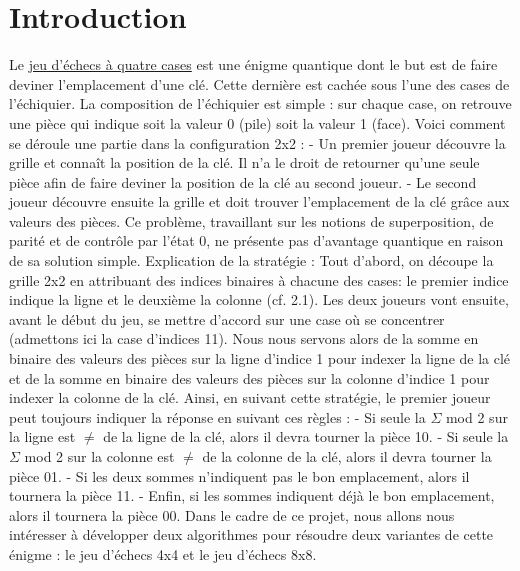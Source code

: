 \documentclass[12pt]{article}
\begin{document}
\section{Introduction}
Le \href{https://www.youtube.com/watch?v=LFwXghcajLw&list=PLtn704u3JW-K4q9YkQWTfWRxaq-9oLfJ3&index=4}{jeu d'échecs à quatre cases} est une énigme quantique dont le but est de faire deviner l'emplacement d'une clé. Cette dernière est cachée sous l'une des cases de l'échiquier.\newline
\newline
La composition de l'échiquier est simple : sur chaque case, on retrouve une pièce qui indique soit la valeur 0 (pile) soit la valeur 1 (face).\newline
\newline
Voici comment se déroule une partie dans la configuration 2x2 :
\newline
- Un premier joueur découvre la grille et connaît la position de la clé. Il n'a le droit de retourner qu'une seule pièce afin de faire deviner la position de la clé au second joueur.
\newline
- Le second joueur découvre ensuite la grille et doit trouver l'emplacement de la clé grâce aux valeurs des pièces.\newline
\newline
Ce problème, travaillant sur les notions de superposition, de parité et de contrôle par l'état 0, ne présente pas d'avantage quantique en raison de sa solution simple.\newline
\newline
Explication de la stratégie :\newline
Tout d'abord, on découpe la grille 2x2 en attribuant des indices binaires à chacune des cases: le premier indice indique la ligne et le deuxième la colonne (cf. 2.1).\newline
Les deux joueurs vont ensuite, avant le début du jeu, se mettre d'accord sur une case où se concentrer (admettons ici la case d'indices 11). Nous nous servons alors de la somme en binaire des valeurs des pièces sur la ligne d'indice 1 pour indexer la ligne de la clé et de la somme en binaire des valeurs des pièces sur la colonne d'indice 1 pour indexer la colonne de la clé.\newline
Ainsi, en suivant cette stratégie, le premier joueur peut toujours indiquer la réponse en suivant ces règles :\newline
- Si seule la $\Sigma$ mod 2 sur la ligne est $\ne$ de la ligne de la clé, alors il devra tourner la pièce 10.\newline
- Si seule la $\Sigma$ mod 2 sur la colonne est $\ne$ de la colonne de la clé, alors il devra tourner la pièce 01.\newline
- Si les deux sommes n'indiquent pas le bon emplacement, alors il tournera la pièce 11.\newline
- Enfin, si les sommes indiquent déjà le bon emplacement, alors il tournera la pièce 00.\newline
\newline
Dans le cadre de ce projet, nous allons nous intéresser à développer deux algorithmes pour résoudre deux variantes de cette énigme : le jeu d'échecs 4x4 et le jeu d'échecs 8x8.
  
\end{document}
